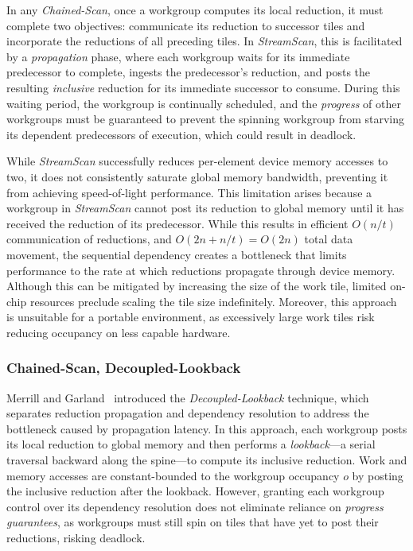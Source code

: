 \documentclass[sigconf]{acmart}
\begin{document}
In any \emph{Chained-Scan}, once a workgroup computes its local reduction, it must complete two objectives: communicate its reduction to successor tiles and incorporate the reductions of all preceding tiles. In \emph{StreamScan}, this is facilitated by a \emph{propagation} phase, where each workgroup waits for its immediate predecessor to complete, ingests the predecessor's reduction, and posts the resulting \emph{inclusive} reduction for its immediate successor to consume. During this waiting period, the workgroup is continually scheduled, and the \emph{progress} of other workgroups must be guaranteed to prevent the spinning workgroup from starving its dependent predecessors of execution, which could result in deadlock.

While \emph{StreamScan} successfully reduces per-element device memory accesses to two, it does not consistently saturate global memory bandwidth, preventing it from achieving speed-of-light performance. This limitation arises because a workgroup in \emph{StreamScan} cannot post its reduction to global memory until it has received the reduction of its predecessor. While this results in efficient $O(n/t)$ communication of reductions, and $O(2n+ n/t)= O(2n)$ total data movement, the sequential dependency creates a bottleneck that limits performance to the rate at which reductions propagate through device memory. Although this can be mitigated by increasing the size of the work tile, limited on-chip resources preclude scaling the tile size indefinitely. Moreover, this approach is unsuitable for a portable environment, as excessively large work tiles risk reducing occupancy on less capable hardware.

\subsubsection{Chained-Scan, Decoupled-Lookback}
Merrill and Garland~\cite{} introduced the \emph{Decoupled-Lookback} technique, which separates reduction propagation and dependency resolution to address the bottleneck caused by propagation latency. In this approach, each workgroup posts its local reduction to global memory and then performs a \emph{lookback}---a serial traversal backward along the spine---to compute its inclusive reduction. Work and memory accesses are constant-bounded to the workgroup occupancy $o$ by posting the inclusive reduction after the lookback. However, granting each workgroup control over its dependency resolution does not eliminate reliance on \emph{progress guarantees}, as workgroups must still spin on tiles that have yet to post their reductions, risking deadlock.
\end{document}
